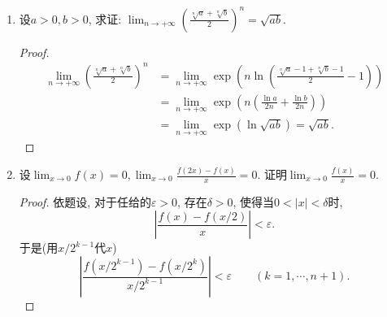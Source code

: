 \begin{2a}
\begin{enumerate}
\begin{proof}[解答]
$\alpha=-1$时，即是调和级数；$\alpha<-1$时，分子$\leqslant1$，分母$\to0^+$。
故$\alpha\leqslant-1$时趋于$+\infty$。
\end{proof}
\item 设\(a>0,b>0\), 求证: \(\lim_{n\rightarrow+\infty}\left(\frac{\sqrt[n]{a}+\sqrt[n]{b}}{2}\right)^n=\sqrt{ab}\).
\begin{proof}
\[\begin{aligned}
\lim_{n\rightarrow+\infty}\left(\frac{\sqrt[n]{a}+\sqrt[n]{b}}{2}\right)^n
&=\lim_{n\rightarrow+\infty}\exp\left(n\ln\left(\frac{\sqrt[n]{a}-1+\sqrt[n]{b}-1}{2}-1\right)\right)\\
&=\lim_{n\rightarrow+\infty}\exp\left(n\left(\frac{\ln a}{2n}+\frac{\ln b}{2n}\right)\right)\\
&=\lim_{n\rightarrow+\infty}\exp\left(\ln\sqrt{ab}\right)=\sqrt{ab}.
\end{aligned}\]
\end{proof}
\item 设\(\lim_{x\rightarrow 0}f(x)=0,\lim_{x\rightarrow 0}\frac{f(2x)-f(x)}{x}=0\). 证明\(\lim_{x\rightarrow 0}\frac{f(x)}{x}=0.\)
\begin{proof}
依题设, 对于任给的\(\varepsilon>0\), 存在\(\delta>0\), 使得当\(0<|x|<\delta\)时,
\[\left|\frac{f(x)-f(x/2)}{x}\right|<\varepsilon.\]
于是(用\(x/2^{k-1}\)代\(x\))\[\left|\frac{f(x/2^{k-1})-f(x/2^k)}{x/2^{k-1}}\right|<\varepsilon\qquad (k=1,\cdots,n+1).\]


\end{proof}
\end{enumerate}
\end{2a}
